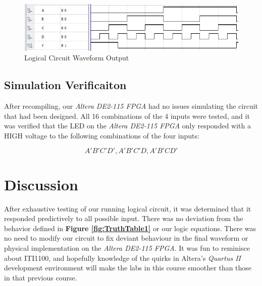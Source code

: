 \documentclass[a4paper,12pt]{article}
\begin{document}
\begin{figure}[H]
\includegraphics[width=\textwidth]{Images/Waveform2.PNG} 
\caption{Logical Circuit Waveform Output}
\label{fig:Wav1}
\end{figure}

\subsection{Simulation Verificaiton}
After recompiling, our \textit{Altera DE2-115 FPGA} had no issues simulating the circuit that had been designed. All 16 combinations of the 4 inputs were tested, and it was verified that the LED on the \textit{Altera DE2-115 FPGA} only responded with a HIGH voltage to the following combinations of the four inputs:

\begin{equation}
A'B'C'D'  ,  A'B'C'D  ,  A'B'CD'
\end{equation}


\section{Discussion}
After exhaustive testing of our running logical circuit, it was determined that it responded predictively to all possible input. There was no deviation from the behavior defined in \textbf{Figure \ref{fig:TruthTable1}} or our logic equations. There was no need to modify our circuit to fix deviant behaviour in the final waveform or physical implementation on the \textit{Altera DE2-115 FPGA}. It was fun to reminisce about ITI1100, and hopefully knowledge of the quirks in Altera's \textit{Quartus II} development environment will make the labs in this course smoother than those in that previous course.
\end{document}
